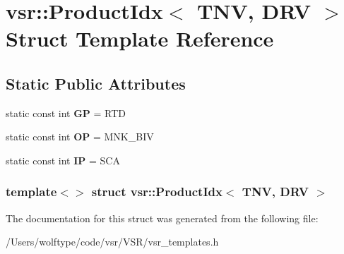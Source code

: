 \hypertarget{structvsr_1_1_product_idx_3_01_t_n_v_00_01_d_r_v_01_4}{\section{vsr\-:\-:Product\-Idx$<$ T\-N\-V, D\-R\-V $>$ Struct Template Reference}
\label{structvsr_1_1_product_idx_3_01_t_n_v_00_01_d_r_v_01_4}
}
\subsection*{Static Public Attributes}
\begin{DoxyCompactItemize}
\item 
\hypertarget{structvsr_1_1_product_idx_3_01_t_n_v_00_01_d_r_v_01_4_acdb09dcd3e47cb27271c5a853f9d9183}{static const int {\bfseries G\-P} = R\-T\-D}\label{structvsr_1_1_product_idx_3_01_t_n_v_00_01_d_r_v_01_4_acdb09dcd3e47cb27271c5a853f9d9183}

\item 
\hypertarget{structvsr_1_1_product_idx_3_01_t_n_v_00_01_d_r_v_01_4_abadca27ebfaf8058cdf507c8b580d751}{static const int {\bfseries O\-P} = M\-N\-K\-\_\-\-B\-I\-V}\label{structvsr_1_1_product_idx_3_01_t_n_v_00_01_d_r_v_01_4_abadca27ebfaf8058cdf507c8b580d751}

\item 
\hypertarget{structvsr_1_1_product_idx_3_01_t_n_v_00_01_d_r_v_01_4_a197676f98421325f26a38daaa371f68f}{static const int {\bfseries I\-P} = S\-C\-A}\label{structvsr_1_1_product_idx_3_01_t_n_v_00_01_d_r_v_01_4_a197676f98421325f26a38daaa371f68f}

\end{DoxyCompactItemize}
\subsubsection*{template$<$$>$ struct vsr\-::\-Product\-Idx$<$ T\-N\-V, D\-R\-V $>$}



The documentation for this struct was generated from the following file\-:\begin{DoxyCompactItemize}
\item 
/\-Users/wolftype/code/vsr/\-V\-S\-R/vsr\-\_\-templates.\-h\end{DoxyCompactItemize}
